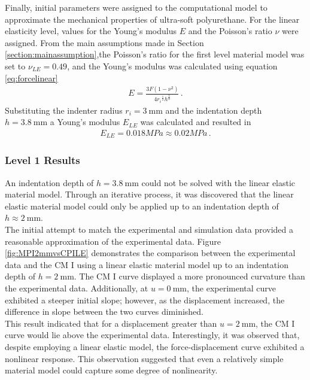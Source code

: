 Finally, initial parameters were assigned to the computational model to approximate the mechanical properties of ultra-soft polyurethane. 
For the linear elasticity level, values for the Young's modulus $E$ and the Poisson's ratio $\nu$ were assigned. 
From the main assumptions made in Section \ref{section:mainassumption},the Poisson's ratio for the first 
level material model was set to $\nu_{LE} =  0.49$, and the Young's modulus was calculated using equation \ref{eq:forcelinear}
\begin{align}
    E = \frac{3F(1-\nu^2)} {4{r_i}^{\frac{1}{2}} {h}^{\frac{3}{2}}}\, .
    \label{eq:forcelinearcp1}
\end{align}
Substituting the indenter radius $r_i = \SI{3}{\milli \meter}$ and the indentation depth $h = \SI{3.8}{\milli \meter}$ a Young's modulus $E_{LE}$ was calculated and resulted in 
\begin{align}
    E_{LE} = 0.018 MPa \approx 0.02 MPa \, .
    \label{eq:Elinearcp1}
\end{align}


\subsubsection*{Level 1 Results}
\label{subsection:level1cmI}
An indentation depth of $h = \SI{3.8}{\milli \meter}$ could not be solved with the linear elastic material model. 
Through an iterative process, it was discovered that the linear elastic material model could only be applied 
up to an indentation depth of $h \approx \SI{2}{\milli \meter}$.\\

The initial attempt to match the experimental and simulation data provided a reasonable approximation of the experimental data.
Figure \ref{fig:MPI2mmvsCPILE} demonstrates the comparison between the experimental data and the CM I using a 
linear elastic material model up to an indentation depth of $h = \SI{2}{\milli \meter}$. The CM I curve displayed 
a more pronounced curvature than the experimental data. Additionally, at $u =\SI{0}{\milli \meter}$, 
the experimental curve exhibited a steeper initial slope; however, as the displacement increased, the 
difference in slope between the two curves diminished.\\

This result indicated that for a displacement greater than $u = \SI{2}{\milli \meter}$, the CM I curve would 
lie above the experimental data. Interestingly, it was observed that, despite employing a linear elastic model, 
the force-displacement curve exhibited a nonlinear response. This observation suggested that even a relatively 
simple material model could capture some degree of nonlinearity. 

